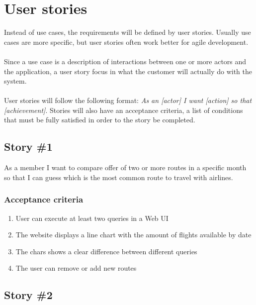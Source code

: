 
\section{User stories}

Instead of use cases, the requirements will be defined by user stories. Usually use cases are more specific, but user stories often work better for agile development.
\\\\
Since a use case is a description of interactions between one or more actors and the application, a user story focus in what the customer will actually do with the system.
\\\\
User stories will follow the following format: \textit{As an [actor] I want [action] so that [achievement]}. Stories will also have an acceptance criteria, a list of conditions that must be fully satisfied in order to the story be completed.

\subsection*{Story \#1}

\begin{displayquote}
As a  member I want to compare offer of two or more routes in a specific month so that I can guess which is the most common route to travel with airlines.
\end{displayquote}

\subsubsection*{Acceptance criteria}

\begin{enumerate}
    \item User can execute at least two queries in a Web UI
    \item The website displays a line chart with the amount of flights available by date
    \item The chars shows a clear difference between different queries
    \item The user can remove or add new routes
\end{enumerate}

\subsection*{Story \#2}

